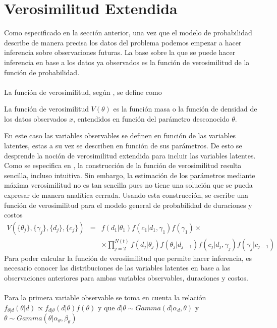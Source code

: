 \section{Verosimilitud Extendida}
Como especificado en la secci\'on anterior, una vez que el modelo de probabilidad describe de manera precisa los datos del problema podemos empezar a hacer inferencia sobre observaciones futuras. La base sobre la que se puede hacer inferencia en base a los datos ya observados es la funci\'on de verosimilitud de la funci\'on de probabilidad.\\
\\
La funci\'on de verosimilitud, seg\'un \cite{held2014applied}, se define como
\begin{defi}
La funci\'on de verosimilitud $V(\theta)$ es la funci\'on masa o la funci\'on de densidad de los datos observados $x$, entendidos en funci\'on del par\'ametro desconocido $\theta$.
\end{defi}
En este caso las variables observables se definen en funci\'on de las variables latentes, estas a su vez se describen en funci\'on de sus par\'ametros. De esto se desprende la noci\'on de verosimilitud extendida para incluir las variables latentes. Como se especifica en \cite{pitt2002constructing}, la construcci\'on de la funci\'on de verosimilitud resulta sencilla, incluso intuitiva. Sin embargo, la estimaci\'on de los par\'ametros mediante m\'axima verosimilitud no es tan sencilla pues no tiene una soluci\'on que se pueda expresar de manera anal\'itica cerrada. Usando esta construcci\'on, se escribe una funci\'on de verosimilitud para el modelo general de probabilidad de duraciones y costos\\
\begin{eqnarray}
V(\{\theta_j\},\{\gamma_j\},\{d_j\},\{c_j\}) &=& f(d_1|\theta_1)f(c_1|d_1,\gamma_1)f(\gamma_1) \times\nonumber\\
&& \times \prod_{j=2}^{N(t)} f(d_j|\theta_j)f(\theta_j|d_{j-1})f(c_j|d_j,\gamma_j)f(\gamma_j|c_{j-1})\nonumber
\end{eqnarray}
Para poder calcular la funci\'on de verosiimilitud que permite hacer inferencia, es necesario conocer las distribuciones de las variables latentes en base a las observaciones anteriores para ambas variables observables, duraciones y costos.\\
\\Para la primera variable observable se toma en cuenta la relaci\'on $f_{\theta|d}(\theta|d)\propto f_{d|\theta}(d|\theta)f(\theta)$ y que $d|\theta \sim Gamma(d|\alpha_d,\theta)$ y $\theta \sim Gamma(\theta|\alpha_\theta,\beta_\theta)$
